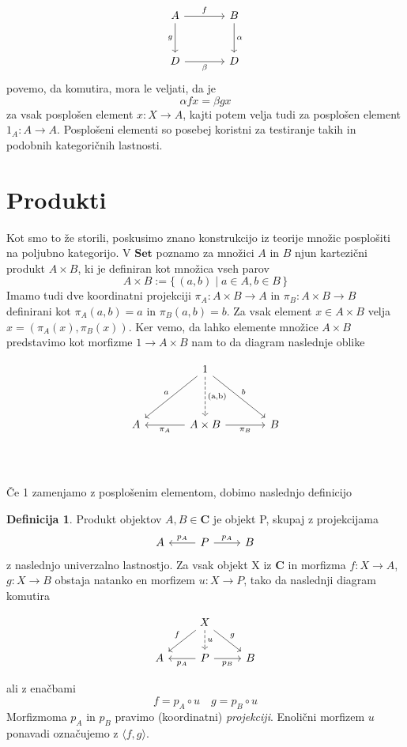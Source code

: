 \documentclass[12pt,a4paper]{book}
\theoremstyle{definition}
\newtheorem{definicija}{Definicija}[chapter]
\theoremstyle{plain}
\theoremstyle{definition}
\theoremstyle{remark}
\newcommand{\cat}[1]{\textbf{#1}}
\renewcommand{\set}[1]{\{\,#1\,\}}
\begin{document}
$$\begin{tikzcd}[column sep=large, row sep=large]
A \ar[d, "g"'] \ar[r, "f"] & B \ar[d, "\alpha"] \\
D \ar[r, "\beta"'] & D
\end{tikzcd}$$
povemo, da komutira, mora le veljati, da je 
$$\alpha f x = \beta g x$$
za vsak posplošen element $x : X \to A$, kajti potem velja tudi za posplošen element $1_A : A \to A$. Posplošeni elementi so posebej koristni za testiranje takih in podobnih kategoričnih lastnosti.

\section{Produkti}
Kot smo to že storili, poskusimo znano konstrukcijo iz teorije množic posplošiti na poljubno kategorijo. V $\cat{Set}$ poznamo za množici $A$ in $B$ njun kartezični produkt $A \times B$, ki je definiran kot množica vseh parov 
$$A \times B := \set{(a,b) \mid a \in A, b \in B}$$
Imamo tudi dve koordinatni projekciji $\pi_A : A\times B \to A$ in $\pi_B : A \times B \to B$ definirani kot $\pi_A(a,b) = a$ in $\pi_B(a,b) = b$. Za vsak element $x \in A \times B$ velja $x = (\pi_A(x), \pi_B(x))$. Ker vemo, da lahko elemente množice $A \times B$ predstavimo kot morfizme $1 \to A \times B$ nam to da diagram naslednje oblike

$$ \begin{tikzcd}[row sep=huge, column sep=large]
&  1 \ar[dl, "a"'] \ar[d, dashed, "\text{(a,b)}", font=\large] \ar[dr, "b"] & \\
A & \ar[l, "\pi_A"] A \times B \ar[r, "\pi_B"'] & B \\
\end{tikzcd} $$

Če 1 zamenjamo z posplošenim elementom, dobimo naslednjo definicijo

\begin{definicija}
Produkt objektov $A,B \in \cat{C}$ je objekt P, skupaj z projekcijama
$$\begin{tikzcd}
A & P \ar[l, "p_A"'] \ar[r, "p_A"] & B
\end{tikzcd}$$
z naslednjo univerzalno lastnostjo. Za vsak objekt X iz $\cat{C}$ in morfizma $f : X \to A$, $g : X \to B$ obstaja natanko en morfizem $u : X \to P$, tako da naslednji diagram komutira

$$\begin{tikzcd}
& X \ar[ld, "f"'] \ar[d, dashed, "u"] \ar[rd, "g"] & \\
A & P \ar[l, "p_A"] \ar[r, "p_B"'] & B
\end{tikzcd}$$

ali z enačbami
$$f = p_A \circ u \quad g = p_B \circ u$$
Morfizmoma $p_A$ in $p_B$ pravimo (koordinatni) \textit{projekciji}. Enolični morfizem $u$ ponavadi označujemo z $\langle f,g \rangle$.
\end{definicija}
\end{document}
